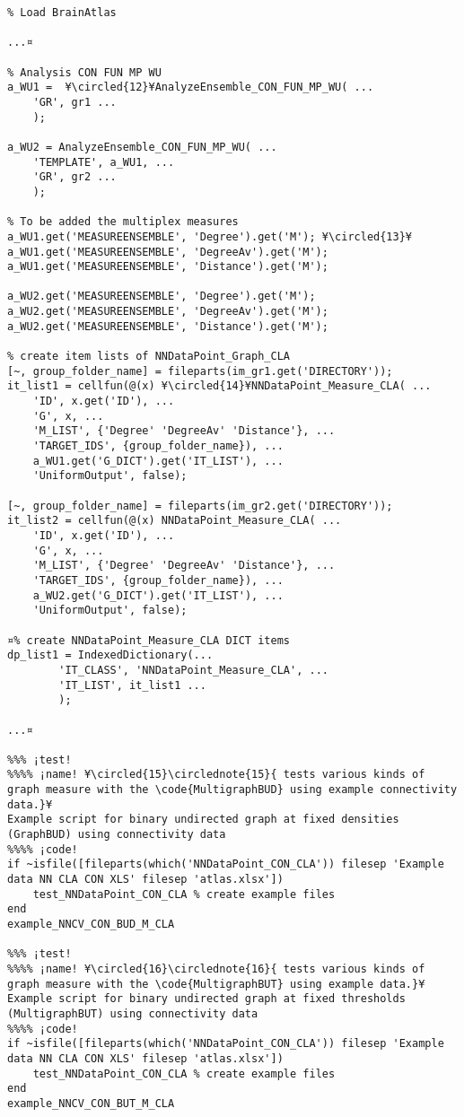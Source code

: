 \documentclass{tufte-handout}
\begin{document}
\begin{lstlisting}
% Load BrainAtlas

...¤

% Analysis CON FUN MP WU
a_WU1 =  ¥\circled{12}¥AnalyzeEnsemble_CON_FUN_MP_WU( ...
    'GR', gr1 ...
    );

a_WU2 = AnalyzeEnsemble_CON_FUN_MP_WU( ...
    'TEMPLATE', a_WU1, ...
    'GR', gr2 ...
    );

% To be added the multiplex measures
a_WU1.get('MEASUREENSEMBLE', 'Degree').get('M'); ¥\circled{13}¥
a_WU1.get('MEASUREENSEMBLE', 'DegreeAv').get('M');
a_WU1.get('MEASUREENSEMBLE', 'Distance').get('M');

a_WU2.get('MEASUREENSEMBLE', 'Degree').get('M');
a_WU2.get('MEASUREENSEMBLE', 'DegreeAv').get('M');
a_WU2.get('MEASUREENSEMBLE', 'Distance').get('M');

% create item lists of NNDataPoint_Graph_CLA
[~, group_folder_name] = fileparts(im_gr1.get('DIRECTORY'));
it_list1 = cellfun(@(x) ¥\circled{14}¥NNDataPoint_Measure_CLA( ...
    'ID', x.get('ID'), ...
    'G', x, ...
    'M_LIST', {'Degree' 'DegreeAv' 'Distance'}, ...
    'TARGET_IDS', {group_folder_name}), ...
    a_WU1.get('G_DICT').get('IT_LIST'), ...
    'UniformOutput', false);

[~, group_folder_name] = fileparts(im_gr2.get('DIRECTORY'));
it_list2 = cellfun(@(x) NNDataPoint_Measure_CLA( ...
    'ID', x.get('ID'), ...
    'G', x, ...
    'M_LIST', {'Degree' 'DegreeAv' 'Distance'}, ...
    'TARGET_IDS', {group_folder_name}), ...
    a_WU2.get('G_DICT').get('IT_LIST'), ...
    'UniformOutput', false);

¤% create NNDataPoint_Measure_CLA DICT items
dp_list1 = IndexedDictionary(...
        'IT_CLASS', 'NNDataPoint_Measure_CLA', ...
        'IT_LIST', it_list1 ...
        );

...¤

%%% ¡test!
%%%% ¡name! ¥\circled{15}\circlednote{15}{ tests various kinds of graph measure with the \code{MultigraphBUD} using example connectivity data.}¥
Example script for binary undirected graph at fixed densities (GraphBUD) using connectivity data
%%%% ¡code!
if ~isfile([fileparts(which('NNDataPoint_CON_CLA')) filesep 'Example data NN CLA CON XLS' filesep 'atlas.xlsx'])
    test_NNDataPoint_CON_CLA % create example files
end
example_NNCV_CON_BUD_M_CLA

%%% ¡test!
%%%% ¡name! ¥\circled{16}\circlednote{16}{ tests various kinds of graph measure with the \code{MultigraphBUT} using example data.}¥
Example script for binary undirected graph at fixed thresholds (MultigraphBUT) using connectivity data
%%%% ¡code!
if ~isfile([fileparts(which('NNDataPoint_CON_CLA')) filesep 'Example data NN CLA CON XLS' filesep 'atlas.xlsx'])
    test_NNDataPoint_CON_CLA % create example files
end
example_NNCV_CON_BUT_M_CLA


\end{lstlisting}
\end{document}
